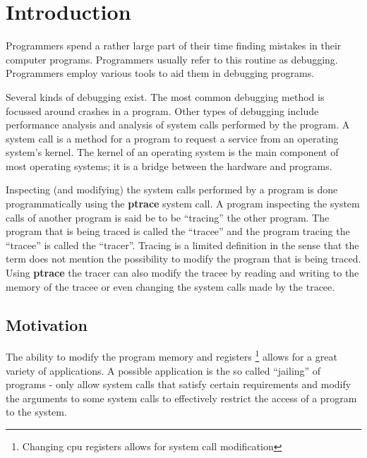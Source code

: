 \documentclass[a4paper, 10pt]{report}
\begin{document}
\chapter{Introduction}

Programmers spend a rather large part of their time finding mistakes in their
computer programs. Programmers usually refer to this routine as debugging.
Programmers employ various tools to aid them in debugging programs.

Several kinds of debugging exist. The most common debugging method is
focussed around crashes in a program. Other types of debugging include
performance analysis and analysis of system calls performed by the program.
A system call is a method for a program to request a service from an operating
system's kernel. The kernel of an operating system is the main component
of most operating systems; it is a bridge between the hardware and programs.


Inspecting (and modifying) the system calls performed by a program
is done programmatically using the \textbf{ptrace} system call.
A program inspecting the
system calls of another program is said be to be ``tracing'' the other
program. The program that is being traced is called the ``tracee'' and the
program tracing the ``tracee'' is called the ``tracer''.
Tracing is a limited definition in the sense that the term does not
mention the possibility to modify the program that is being traced.
Using \textbf{ptrace} the tracer can also modify the tracee by
reading and writing to the memory of the tracee or even changing the
system calls made by the tracee.


\section{Motivation}
The ability to modify the program memory and registers
\footnote{Changing cpu registers allows for system call modification}
allows for a great variety of applications.
A possible application is the so called ``jailing''
of programs - only allow system calls that satisfy certain requirements
and modify the arguments to some system calls to effectively
restrict the access of a program to the system.
\end{document}

